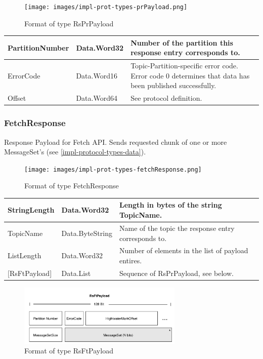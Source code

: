 \begin{figure}[H]
    \centering
    \texttt{[image: images/impl-prot-types-prPayload.png]}
    \caption{Format of type RsPrPayload}
    \label{fig:impl-prot-types-prPayload}
\end{figure}


\begin{table}[H]
\centering
\begin{tabular}{ l  l  p{8cm} }
\hline
PartitionNumber & Data.Word32 & Number of the partition this response entry
corresponds to.                                                \\ \hline
ErrorCode       & Data.Word16 & Topic-Partition-specific error code. Error code
0 determines that data has been published successfully. \\ \hline
Offset          & Data.Word64 & See protocol definition.
\\ \hline
\end{tabular}
\end{table}

\subsubsection{FetchResponse}

Response Payload for Fetch API. Sends requested chunk of one or more
MessageSet's (see \ref{impl-protocol-types-data}).

\begin{figure}[H]
    \centering
    \texttt{[image: images/impl-prot-types-fetchResponse.png]}
    \caption{Format of type FetchResponse}
\end{figure}

\begin{table}[H]
\centering
\begin{tabular}{ l  l  p{8cm} }
\hline
StringLength      & Data.Word32     & Length in bytes of the string TopicName. \\ \hline
TopicName         & Data.ByteString & Name of the topic the response entry corresponds to.\\ \hline
ListLength        & Data.Word32     & Number of elements in the list of payload
entires.\\ \hline
{[}RsFtPayload{]} & Data.List       & Sequence of RsPrPayload, see below.
\\ \hline
\end{tabular}
\end{table}

\begin{figure}[H]
    \centering
    \includegraphics[width=0.7\textwidth]{images/impl-prot-types-ftPayload.png}
    \caption{Format of type RsFtPayload}
\end{figure}

